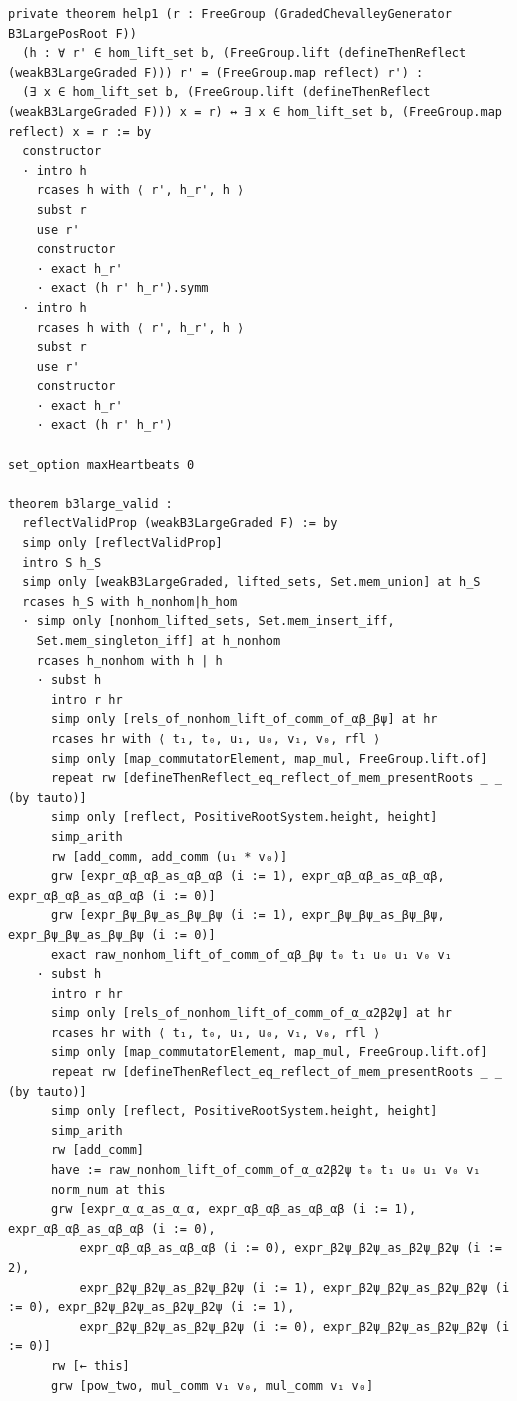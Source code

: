 \documentclass[10pt,a4paper]{article}
\begin{document}
\begin{Verbatim}
private theorem help1 (r : FreeGroup (GradedChevalleyGenerator B3LargePosRoot F))
  (h : ∀ r' ∈ hom_lift_set b, (FreeGroup.lift (defineThenReflect (weakB3LargeGraded F))) r' = (FreeGroup.map reflect) r') :
  (∃ x ∈ hom_lift_set b, (FreeGroup.lift (defineThenReflect (weakB3LargeGraded F))) x = r) ↔ ∃ x ∈ hom_lift_set b, (FreeGroup.map reflect) x = r := by
  constructor
  · intro h
    rcases h with ⟨ r', h_r', h ⟩
    subst r
    use r'
    constructor
    · exact h_r'
    · exact (h r' h_r').symm
  · intro h
    rcases h with ⟨ r', h_r', h ⟩
    subst r
    use r'
    constructor
    · exact h_r'
    · exact (h r' h_r')

set_option maxHeartbeats 0

theorem b3large_valid :
  reflectValidProp (weakB3LargeGraded F) := by
  simp only [reflectValidProp]
  intro S h_S
  simp only [weakB3LargeGraded, lifted_sets, Set.mem_union] at h_S
  rcases h_S with h_nonhom|h_hom
  · simp only [nonhom_lifted_sets, Set.mem_insert_iff,
    Set.mem_singleton_iff] at h_nonhom
    rcases h_nonhom with h | h
    · subst h
      intro r hr
      simp only [rels_of_nonhom_lift_of_comm_of_αβ_βψ] at hr
      rcases hr with ⟨ t₁, t₀, u₁, u₀, v₁, v₀, rfl ⟩
      simp only [map_commutatorElement, map_mul, FreeGroup.lift.of]
      repeat rw [defineThenReflect_eq_reflect_of_mem_presentRoots _ _ (by tauto)]
      simp only [reflect, PositiveRootSystem.height, height]
      simp_arith
      rw [add_comm, add_comm (u₁ * v₀)]
      grw [expr_αβ_αβ_as_αβ_αβ (i := 1), expr_αβ_αβ_as_αβ_αβ, expr_αβ_αβ_as_αβ_αβ (i := 0)]
      grw [expr_βψ_βψ_as_βψ_βψ (i := 1), expr_βψ_βψ_as_βψ_βψ, expr_βψ_βψ_as_βψ_βψ (i := 0)]
      exact raw_nonhom_lift_of_comm_of_αβ_βψ t₀ t₁ u₀ u₁ v₀ v₁
    · subst h
      intro r hr
      simp only [rels_of_nonhom_lift_of_comm_of_α_α2β2ψ] at hr
      rcases hr with ⟨ t₁, t₀, u₁, u₀, v₁, v₀, rfl ⟩
      simp only [map_commutatorElement, map_mul, FreeGroup.lift.of]
      repeat rw [defineThenReflect_eq_reflect_of_mem_presentRoots _ _ (by tauto)]
      simp only [reflect, PositiveRootSystem.height, height]
      simp_arith
      rw [add_comm]
      have := raw_nonhom_lift_of_comm_of_α_α2β2ψ t₀ t₁ u₀ u₁ v₀ v₁
      norm_num at this
      grw [expr_α_α_as_α_α, expr_αβ_αβ_as_αβ_αβ (i := 1), expr_αβ_αβ_as_αβ_αβ (i := 0),
          expr_αβ_αβ_as_αβ_αβ (i := 0), expr_β2ψ_β2ψ_as_β2ψ_β2ψ (i := 2),
          expr_β2ψ_β2ψ_as_β2ψ_β2ψ (i := 1), expr_β2ψ_β2ψ_as_β2ψ_β2ψ (i := 0), expr_β2ψ_β2ψ_as_β2ψ_β2ψ (i := 1),
          expr_β2ψ_β2ψ_as_β2ψ_β2ψ (i := 0), expr_β2ψ_β2ψ_as_β2ψ_β2ψ (i := 0)]
      rw [← this]
      grw [pow_two, mul_comm v₁ v₀, mul_comm v₁ v₀]

\end{Verbatim}
\end{document}
